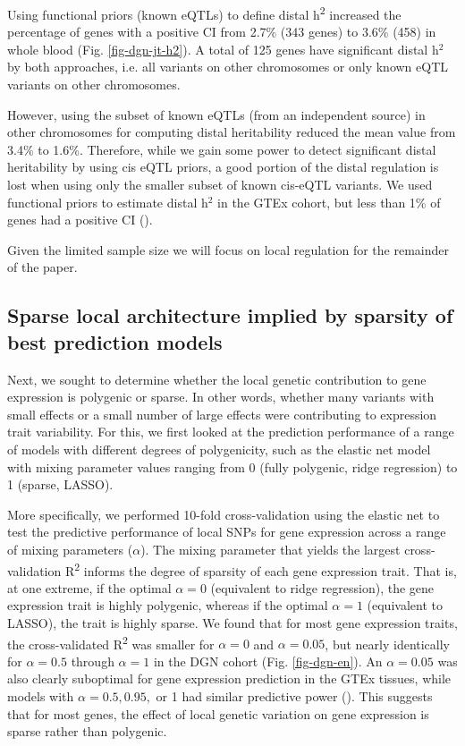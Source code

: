 \documentclass[10pt,letterpaper]{article}
\begin{document}
Using functional priors (known eQTLs) to define distal h\textsuperscript{2} increased the percentage of genes with a positive CI from 2.7\% (343 genes) to 3.6\% (458) in whole blood (Fig. \ref{fig-dgn-jt-h2}). A total of 125 genes have significant distal h$^2$ by both approaches, i.e. all variants on other chromosomes or only  known eQTL variants on other chromosomes.

However, using the subset of known eQTLs (from an independent source) in other chromosomes for computing distal heritability reduced the mean value from 3.4\% to 1.6\%. Therefore, while we gain some power to detect significant distal heritability by using cis eQTL priors, a good portion of the distal regulation is lost when using only the smaller subset of known cis-eQTL variants. We used functional priors to estimate distal h$^2$ in the GTEx cohort, but less than 1\% of genes had a positive CI ().

Given the limited sample size we will focus on local regulation for the remainder of the paper.

\subsection*{Sparse local architecture implied by sparsity of best prediction models }\label{the-effect-of-local-genetic-variation-on-gene-expression-is-sparse-rather-than-polygenic}

Next, we sought to determine whether the local genetic contribution to gene expression is polygenic or sparse. In other words, whether many variants with small effects or a small number of large effects were contributing to expression trait variability. For this, we first looked at the prediction performance of a range of models with different degrees of polygenicity, such as the elastic net model with  mixing parameter values ranging from 0 (fully polygenic, ridge regression) to 1 (sparse, LASSO).

More specifically, we performed 10-fold cross-validation using the elastic net \cite{Zou_2005} to test the predictive performance of local SNPs for gene expression across a range of mixing parameters ($\alpha$). The mixing parameter that yields the largest cross-validation R\textsuperscript{2} informs the degree of sparsity of each gene expression trait. That is, at one extreme, if the optimal \(\alpha=0\) (equivalent to ridge regression), the gene expression trait is highly polygenic, whereas if the optimal \(\alpha=1\) (equivalent to LASSO), the trait is highly sparse. We found that for most gene expression traits, the cross-validated R\textsuperscript{2} was smaller for \(\alpha=0\) and \(\alpha=0.05\), but nearly identically for \(\alpha=0.5\) through \(\alpha=1\) in the DGN cohort (Fig. \ref{fig-dgn-en}). An \(\alpha=0.05\) was also clearly suboptimal for gene expression prediction in the GTEx tissues, while models with \(\alpha=0.5,0.95,\) or 1 had similar predictive power (). This suggests that for most genes, the effect of local genetic variation on gene expression is sparse rather than polygenic.
\end{document}
